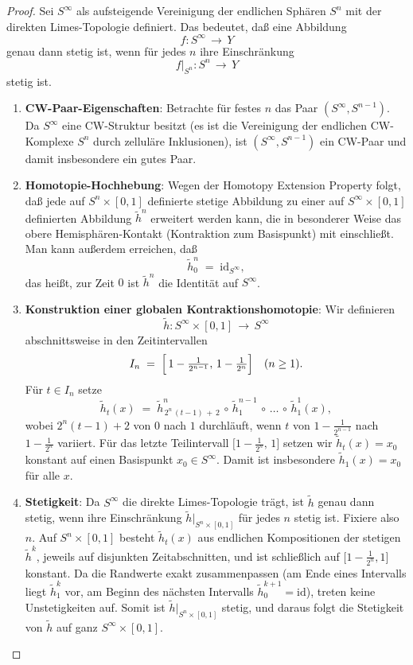 \documentclass[12pt]{article}
\numberwithin{conj}{section}
\begin{document}
    \begin{proof}
    Sei \(S^\infty\) als aufsteigende Vereinigung der endlichen Sphären \(S^n\) mit der direkten Limes-Topologie definiert. Das bedeutet, daß eine Abbildung
    \[
    f \colon S^\infty \,\longrightarrow\, Y
    \]
    genau dann stetig ist, wenn für jedes \(n\) ihre Einschränkung
    \[
    f\vert_{S^n} \colon S^n \,\longrightarrow\, Y
    \]
    stetig ist. 

    \begin{enumerate}
        \item \textbf{CW-Paar-Eigenschaften}: Betrachte für festes \(n\) das Paar \((S^\infty, S^{n-1})\). Da \(S^\infty\) eine CW-Struktur besitzt (es ist die Vereinigung der endlichen CW-Komplexe \(S^n\) durch zelluläre Inklusionen), ist \((S^\infty, S^{n-1})\) ein CW-Paar und damit insbesondere ein gutes Paar.
        \item \textbf{Homotopie-Hochhebung}: Wegen der Homotopy Extension Property folgt, daß jede auf \(S^n \times [0,1]\) definierte stetige Abbildung zu einer auf \(S^\infty \times [0,1]\) definierten Abbildung \(\tilde{h}^n\) erweitert werden kann, die in besonderer Weise das obere Hemisphären-Kontakt (Kontraktion zum Basispunkt) mit einschließt. Man kann außerdem erreichen, daß
        \[
        \tilde{h}^n_0 \;=\;\mathrm{id}_{S^\infty},
        \]
        das heißt, zur Zeit \(0\) ist \(\tilde{h}^n\) die Identität auf \(S^\infty\).
        \item \textbf{Konstruktion einer globalen Kontraktionshomotopie}: Wir definieren
        \[
        \tilde{h} \colon S^\infty \times [0,1] \,\longrightarrow\, S^\infty
        \]
        abschnittsweise in den Zeitintervallen
        \[
        I_n \;=\;\Bigl[\,1 - \tfrac{1}{2^{n-1}},\,1 - \tfrac{1}{2^n}\Bigr]
        \quad
        (n \ge 1).
        \]
        Für \(t \in I_n\) setze
        \[
        \tilde{h}_t(x)
        \;=\;
        \tilde{h}^n_{\,2^n\,(t-1)\,+\,2}\,\circ\,\tilde{h}^{n-1}_1\,\circ\,\dots\,\circ\,\tilde{h}^1_1(x),
        \]
        wobei \(2^n(t-1)+2\) von \(0\) nach \(1\) durchläuft, wenn \(t\) von \(1 - \tfrac{1}{2^{n-1}}\) nach \(1 - \tfrac{1}{2^n}\) variiert. Für das letzte Teilintervall \(\bigl[1 - \tfrac{1}{2^n},\,1\bigr]\) setzen wir \(\tilde{h}_t(x)=x_0\) konstant auf einen Basispunkt \(x_0\in S^\infty\). Damit ist insbesondere \(\tilde{h}_1(x)=x_0\) für alle \(x\).
        \item \textbf{Stetigkeit}: Da \(S^\infty\) die direkte Limes-Topologie trägt, ist \(\tilde{h}\) genau dann stetig, wenn ihre Einschränkung \(\tilde{h}\vert_{S^n \times [0,1]}\) für jedes \(n\) stetig ist. Fixiere also \(n\). Auf \(S^n \times [0,1]\) besteht \(\tilde{h}_t(x)\) aus endlichen Kompositionen der stetigen \(\tilde{h}^k\), jeweils auf disjunkten Zeitabschnitten, und ist schließlich auf \(\bigl[1 - \tfrac{1}{2^n},1\bigr]\) konstant. Da die Randwerte exakt zusammenpassen (am Ende eines Intervalls liegt \(\tilde{h}^k_1\) vor, am Beginn des nächsten Intervalls \(\tilde{h}^{k+1}_0 = \mathrm{id}\)), treten keine Unstetigkeiten auf. Somit ist \(\tilde{h}\vert_{S^n \times [0,1]}\) stetig, und daraus folgt die Stetigkeit von \(\tilde{h}\) auf ganz \(S^\infty \times [0,1]\). 

\end{enumerate}
\end{proof}
\end{document}

